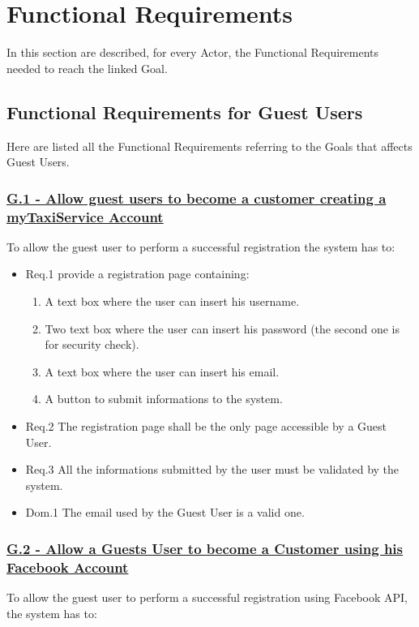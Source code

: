 \section{Functional Requirements}
	In this section are described, for every Actor, the Functional Requirements needed to reach the linked Goal.

		\subsection{Functional Requirements for Guest Users}
		Here are listed all the Functional Requirements referring to the Goals that affects Guest Users.

			\subsubsection{\lbrack \hyperref[sec:g1]{G.1 - Allow guest users to become a customer creating a myTaxiService Account}\rbrack}\label{sec:frs1}
			To allow the guest user to perform a successful registration the system has to:

				\begin{itemize}
					\item \lbrack Req.1\rbrack \label{sec:fr1_g1} provide a registration page containing:
						\begin{enumerate}
							\item A text box where the user can insert his username.
							\item Two text box where the user can insert his password (the second one is for security check).
							\item A text box where the user can insert his email. 
							\item A button to submit informations to the system.
						\end{enumerate}
					\item \lbrack Req.2\rbrack \label{sec:fr2_g1} The registration page shall be the only page accessible by a Guest User.
					\item \lbrack Req.3\rbrack \label{sec:fr3_g1} All the informations submitted by the user must be validated by the system.
					\item \lbrack Dom.1\rbrack \label{sec:da1_g1} The email used by the Guest User is a valid one.
				\end{itemize}

			\subsubsection{\lbrack \hyperref[sec:g2]{G.2 - Allow a Guests User to become a Customer using his Facebook Account}\rbrack}\label{sec:frs2}
			To allow the guest user to perform a successful registration using Facebook API, the system has to:


